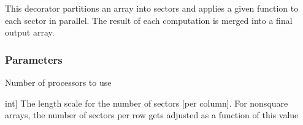 \documentclass[letterpaper,10pt,english]{sphinxmanual}
\begin{document}
\begin{fulllineitems}
\label{\detokenize{api:tensorscout.cakerun}}
\pysigstartsignatures
{}
\pysigstopsignatures
\sphinxAtStartPar
This decorator partitions an array into sectors and applies a given function to each sector in parallel. The result of each computation is merged into a final output array.


\subsubsection{Parameters}
\label{\detokenize{api:id1}}\begin{description}
\sphinxAtStartPar
Number of processors to use

\sphinxlineitem{L\_sectors}{[}int{]}
\sphinxAtStartPar
The length scale for the number of sectors {[}per column{]}. For non\sphinxhyphen{}square arrays, the number of sectors per row gets adjusted as a function of this value

\end{description}

\end{fulllineitems}




\renewcommand{\indexname}{Index}
\printindex
\end{document}
